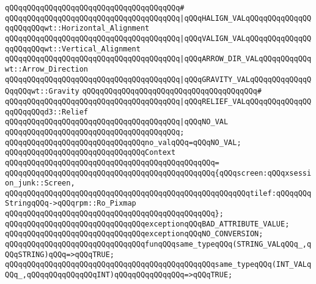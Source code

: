 \verb|qQQqqQQqqQQqqQQqqQQqqQQqqQQqqQQqqQQqqQQq#|\newline
\verb|qQQqqQQqqQQqqQQqqQQqqQQqqQQqqQQqqQQqqQQq|\verb#|qQQqHALIGN_VALqQQqqQQqqQQqqQQqqQQqqQQqwt::Horizontal_Alignment#\newline
\verb|qQQqqQQqqQQqqQQqqQQqqQQqqQQqqQQqqQQqqQQq|\verb#|qQQqVALIGN_VALqQQqqQQqqQQqqQQqqQQqqQQqwt::Vertical_Alignment#\newline
\verb|qQQqqQQqqQQqqQQqqQQqqQQqqQQqqQQqqQQqqQQq|\verb#|qQQqARROW_DIR_VALqQQqqQQqqQQqwt::Arrow_Direction#\newline
\verb|qQQqqQQqqQQqqQQqqQQqqQQqqQQqqQQqqQQqqQQq|\verb#|qQQqGRAVITY_VALqQQqqQQqqQQqqQQqqQQqwt::Gravity#\newline
\verb|qQQqqQQqqQQqqQQqqQQqqQQqqQQqqQQqqQQqqQQq#|\newline
\verb|qQQqqQQqqQQqqQQqqQQqqQQqqQQqqQQqqQQqqQQq|\verb#|qQQqRELIEF_VALqQQqqQQqqQQqqQQqqQQqqQQqd3::Relief#\newline
\verb|qQQqqQQqqQQqqQQqqQQqqQQqqQQqqQQqqQQqqQQq|\verb#|qQQqNO_VAL#\newline
\verb|qQQqqQQqqQQqqQQqqQQqqQQqqQQqqQQqqQQqqQQq;|\newline
\newline
\verb|qQQqqQQqqQQqqQQqqQQqqQQqqQQqqQQqno_valqQQq=qQQqNO_VAL;|\newline
\newline
\verb|qQQqqQQqqQQqqQQqqQQqqQQqqQQqqQQqContext|\newline
\verb|qQQqqQQqqQQqqQQqqQQqqQQqqQQqqQQqqQQqqQQqqQQqqQQq=|\newline
\verb|qQQqqQQqqQQqqQQqqQQqqQQqqQQqqQQqqQQqqQQqqQQqqQQq{qQQqscreen:qQQqxsession_junk::Screen,|\newline
\verb|qQQqqQQqqQQqqQQqqQQqqQQqqQQqqQQqqQQqqQQqqQQqqQQqqQQqqQQqtilef:qQQqqQQqStringqQQq->qQQqrpm::Ro_Pixmap|\newline
\verb|qQQqqQQqqQQqqQQqqQQqqQQqqQQqqQQqqQQqqQQqqQQqqQQq};|\newline
\newline
\verb|qQQqqQQqqQQqqQQqqQQqqQQqqQQqqQQqexceptionqQQqBAD_ATTRIBUTE_VALUE;|\newline
\verb|qQQqqQQqqQQqqQQqqQQqqQQqqQQqqQQqexceptionqQQqNO_CONVERSION;|\newline
\newline
\verb|qQQqqQQqqQQqqQQqqQQqqQQqqQQqqQQqfunqQQqsame_typeqQQq(STRING_VALqQQq_,qQQqSTRING)qQQq=>qQQqTRUE;|\newline
\verb|qQQqqQQqqQQqqQQqqQQqqQQqqQQqqQQqqQQqqQQqqQQqqQQqsame_typeqQQq(INT_VALqQQq_,qQQqqQQqqQQqqQQqINT)qQQqqQQqqQQqqQQq=>qQQqTRUE;|\newline
